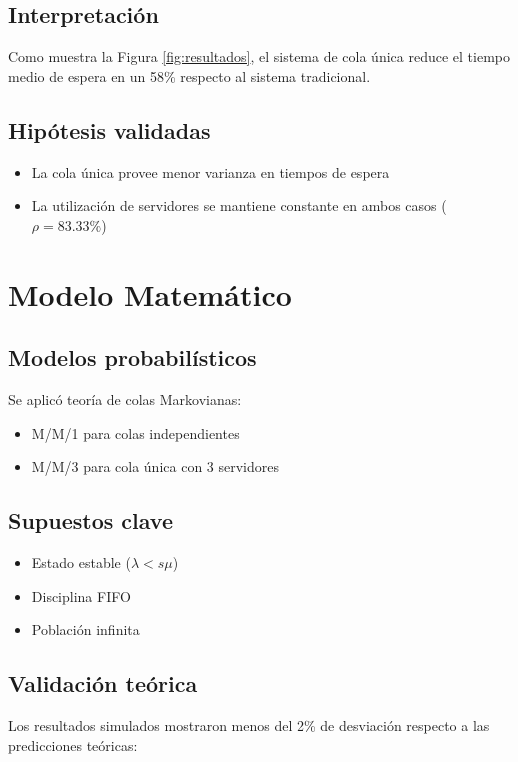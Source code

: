 \documentclass{article}
\begin{document}
\subsection{Interpretación}
Como muestra la Figura \ref{fig:resultados}, el sistema de cola única reduce el tiempo medio de espera en un 58\% respecto al sistema tradicional.

\subsection{Hipótesis validadas}
\begin{itemize}
\item La cola única provee menor varianza en tiempos de espera
\item La utilización de servidores se mantiene constante en ambos casos ($\rho = 83.33\%$)
\end{itemize}

\newpage

\section{Modelo Matemático}\label{sec:modelo}
\subsection{Modelos probabilísticos}
Se aplicó teoría de colas Markovianas:
\begin{itemize}
\item M/M/1 para colas independientes
\item M/M/3 para cola única con 3 servidores
\end{itemize}

\subsection{Supuestos clave}
\begin{itemize}
\item Estado estable ($\lambda < s\mu$)
\item Disciplina FIFO
\item Población infinita
\end{itemize}

\subsection{Validación teórica}
Los resultados simulados mostraron menos del 2\% de desviación respecto a las predicciones teóricas:
\end{document}
